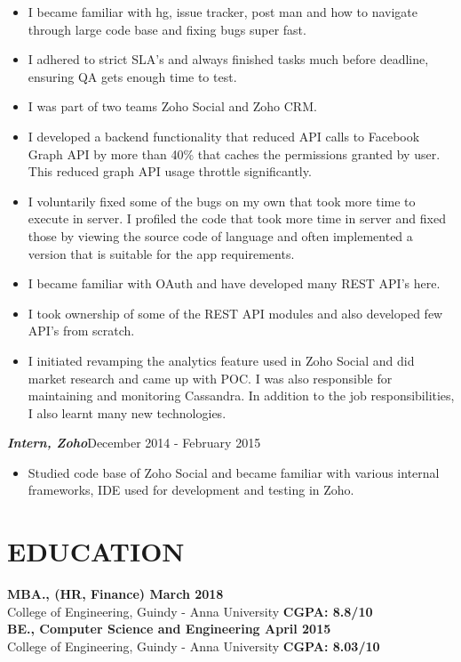 \documentclass[11pt,a4paper]{article}
\begin{document}
\begin{itemize}[noitemsep]
\item I became familiar with hg, issue tracker, post man and how to navigate through large code base and fixing bugs super fast.  
\item I adhered to strict SLA's and always finished tasks much before deadline, ensuring QA gets enough time to test. 
\item I was part of two teams Zoho Social and Zoho CRM. 
\item I developed a backend functionality that reduced API calls to Facebook Graph API by more than 40\%  that caches the permissions granted by user. This reduced graph API usage throttle significantly. 
\item I voluntarily fixed some of the bugs on my own that took more time to execute in server. I profiled the code that took more time in server and fixed those by viewing the source code of language and often implemented a version that is suitable for the app requirements. 
\item I became familiar with OAuth and have developed many REST API's here. 
\item I took ownership of some of the REST API modules and also developed few API's from scratch. 
\item I initiated revamping the analytics feature used in Zoho Social and did  market research and came up with POC. I was also responsible for maintaining and monitoring Cassandra. In addition to the job responsibilities, I also learnt many new technologies.
\end{itemize}
\emph{\textbf{Intern, Zoho}}{\hfill December 2014 - February 2015}
\begin{itemize}[noitemsep]
\item Studied code base of Zoho Social and became familiar with various internal frameworks, IDE used for development and testing in Zoho.
\end{itemize}
\section*{EDUCATION}
\textbf{MBA., (HR, Finance) {\hfill March 2018}}\\
College of Engineering, Guindy - Anna University {\hfill \textbf{CGPA: 8.8/10}}\\
\textbf{BE., Computer Science and Engineering {\hfill April 2015}}\\
College of Engineering, Guindy - Anna University {\hfill \textbf{CGPA: 8.03/10}}\\
\end{document}
